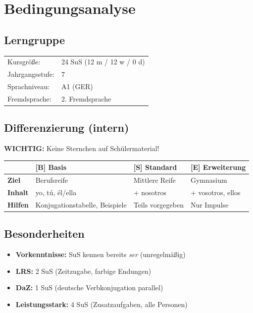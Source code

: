 \documentclass[11pt,a4paper]{article}
\newcommand{\jahrgangsstufe}{7}
\newcommand{\lerngruppengroesse}{24}
\newcommand{\maennlich}{12}
\newcommand{\weiblich}{12}
\newcommand{\divers}{0}
\newcommand{\gerniveau}{A1}
\begin{document}
\section{Bedingungsanalyse}

\subsection{Lerngruppe}
\begin{tabular}{ll}
    Kursgröße: & \lerngruppengroesse{} SuS (\maennlich{} m / \weiblich{} w / \divers{} d) \\
    Jahrgangsstufe: & \jahrgangsstufe \\
    Sprachniveau: & \gerniveau{} (GER) \\
    Fremdsprache: & 2. Fremdsprache \\
\end{tabular}

\subsection{Differenzierung (intern)}

\textbf{WICHTIG:} Keine Sternchen auf Schülermaterial!

\begin{tabular}{|l|p{4cm}|p{4cm}|p{4cm}|}
\hline
& \textbf{[B] Basis} & \textbf{[S] Standard} & \textbf{[E] Erweiterung} \\
\hline
\textbf{Ziel} & Berufsreife & Mittlere Reife & Gymnasium \\
\hline
\textbf{Inhalt} & yo, tú, él/ella & + nosotros & + vosotros, ellos \\
\hline
\textbf{Hilfen} & Konjugationstabelle, Beispiele & Teils vorgegeben & Nur Impulse \\
\hline
\end{tabular}

\subsection{Besonderheiten}
\begin{itemize}
    \item \textbf{Vorkenntnisse:} SuS kennen bereits \textit{ser} (unregelmäßig)
    \item \textbf{LRS:} 2 SuS (Zeitzugabe, farbige Endungen)
    \item \textbf{DaZ:} 1 SuS (deutsche Verbkonjugation parallel)
    \item \textbf{Leistungsstark:} 4 SuS (Zusatzaufgaben, alle Personen)
\end{itemize}
\end{document}
